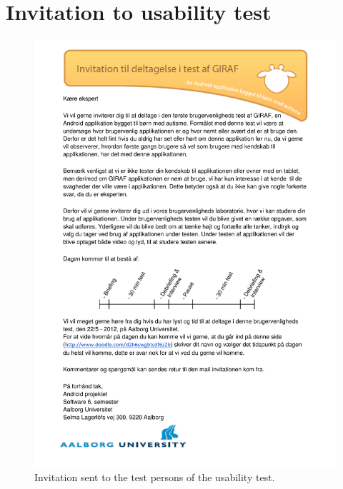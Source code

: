 \chapter{Invitation to usability test}
\label{appendice:usability_test}
\begin{figure}%
	\begin{center}
	\includegraphics[width=\textwidth]{input/appendices/invitation_to_usability_test.pdf}
	\end{center}
\caption{Invitation sent to the test persons of the usability test.}%
\end{figure}